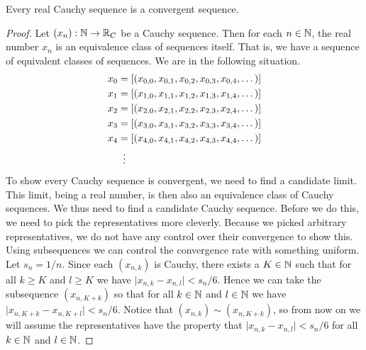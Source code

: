 \documentclass[../main.tex]{subfiles}
\begin{document}
\begin{proposition}\label{prp:the_real_numbers:cantor_R_cauchy_complete}
    Every real Cauchy sequence is a convergent sequence.
\end{proposition}
\begin{proof}
    Let $(x_n):\mathbb{N}\to\mathbb{R}_C$ be a Cauchy sequence. Then for each $n\in\mathbb{N}$, the real number $x_n$ is an equivalence class of sequences itself. That is, we have a sequence of equivalent classes of sequences. We are in the following situation.
    \begin{align}\label{eqn:the_real_numbers:sequence_of_sequences}
        \begin{split}
            x_0 & =[(x_{0,0},x_{0,1},x_{0,2},x_{0,3},x_{0,4},\dots)] \\
            x_1 & =[(x_{1,0},x_{1,1},x_{1,2},x_{1,3},x_{1,4},\dots)] \\
            x_2 & =[(x_{2,0},x_{2,1},x_{2,2},x_{2,3},x_{2,4},\dots)] \\
            x_3 & =[(x_{3,0},x_{3,1},x_{3,2},x_{3,3},x_{3,4},\dots)] \\
            x_4 & =[(x_{4,0},x_{4,1},x_{4,2},x_{4,3},x_{4,4},\dots)] \\
             & \vdotswithin{=}
        \end{split}
    \end{align}
    To show every Cauchy sequence is convergent, we need to find a candidate limit. This limit, being a real number, is then also an equivalence class of Cauchy sequences. We thus need to find a candidate Cauchy sequence. Before we do this, we need to pick the representatives more cleverly. Because we picked arbitrary representatives, we do not have any control over their convergence to show this. Using subsequences we can control the convergence rate with something uniform. Let $s_n=1/n$. Since each $(x_{n,k})$ is Cauchy, there exists a $K\in\mathbb{N}$ such that for all $k\geq K$ and $l\geq K$ we have $\vert x_{n,k}-x_{n,l}\vert<s_n/6$. Hence we can take the subsequence $(x_{n,K+k})$ so that for all $k\in\mathbb{N}$ and $l\in\mathbb{N}$ we have $\vert x_{n,K+k}-x_{n,K+l}\vert<s_n/6$. Notice that $(x_{n,k})\sim(x_{n,K+k})$, so from now on we will assume the representatives have the property that $\vert x_{n,k}-x_{n,l}\vert<s_n/6$ for all $k\in\mathbb{N}$ and $l\in\mathbb{N}$.


\end{proof}
\end{document}
